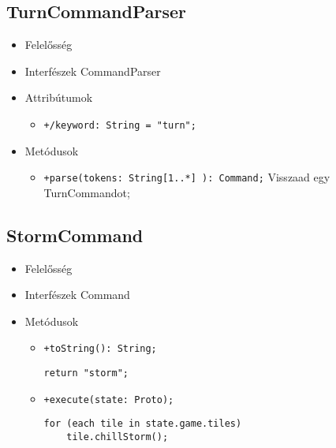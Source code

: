 \subsection{TurnCommandParser}
\begin{itemize}
\item Felelősség\newline
\item Interfészek\newline
CommandParser
\item Attribútumok
	\begin{itemize}
		\item \texttt{+/keyword: String = "turn";}
	\end{itemize}
\item Metódusok
\begin{itemize}
		\item \texttt{+parse(tokens: String[1..*] ): Command;} \newline
		Visszaad egy TurnCommandot;
	\end{itemize}
\end{itemize}

\subsection{StormCommand}
\begin{itemize}
\item Felelősség\newline
\item Interfészek\newline
Command
\item Metódusok
\begin{itemize}
		\item \texttt{+toString(): String;}
		\begin{lstlisting}
return "storm";
		\end{lstlisting}
		\item \texttt{+execute(state: Proto);} \newline
		\begin{lstlisting}
for (each tile in state.game.tiles)
	tile.chillStorm();
		\end{lstlisting}
	\end{itemize}
\end{itemize}
